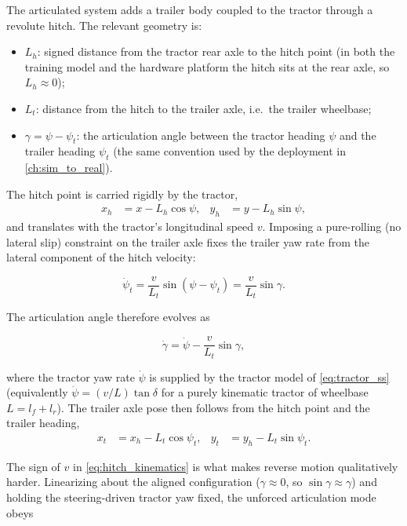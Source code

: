 The articulated system adds a trailer body coupled to the tractor through a revolute hitch.
The relevant geometry is:
\begin{itemize}
    \item $L_h$: signed distance from the tractor rear axle to the hitch point (in both the
    training model and the hardware platform the hitch sits at the rear axle, so
    $L_h \approx 0$);
    \item $L_t$: distance from the hitch to the trailer axle, i.e.\ the trailer wheelbase;
    \item $\gamma = \psi - \psi_t$: the articulation angle between the tractor heading $\psi$
    and the trailer heading $\psi_t$ (the same convention used by the deployment in
    \cref{ch:sim_to_real}).
\end{itemize}

The hitch point is carried rigidly by the tractor,
\begin{align}
    x_h &= x - L_h\cos\psi, & y_h &= y - L_h\sin\psi,
    \label{eq:hitch_point}
\end{align}
and translates with the tractor's longitudinal speed $v$. Imposing a pure-rolling (no lateral
slip) constraint on the trailer axle fixes the trailer yaw rate from the lateral component of
the hitch velocity:

\begin{equation}
    \dot{\psi}_t = \frac{v}{L_t}\sin(\psi - \psi_t) = \frac{v}{L_t}\sin\gamma .
    \label{eq:trailer_yaw}
\end{equation}

The articulation angle therefore evolves as

\begin{equation}
    \dot{\gamma} = \dot{\psi} - \frac{v}{L_t}\sin\gamma ,
    \label{eq:hitch_kinematics}
\end{equation}

where the tractor yaw rate $\dot{\psi}$ is supplied by the tractor model of
\cref{eq:tractor_ss} (equivalently $\dot{\psi} = (v/L)\tan\delta$ for a purely kinematic
tractor of wheelbase $L = l_f + l_r$). The trailer axle pose then follows from the hitch point
and the trailer heading,
\begin{align}
    x_t &= x_h - L_t\cos\psi_t, & y_t &= y_h - L_t\sin\psi_t .
    \label{eq:trailer_axle}
\end{align}

The sign of $v$ in \cref{eq:hitch_kinematics} is what makes reverse motion qualitatively
harder. Linearizing about the aligned configuration ($\gamma \approx 0$, so
$\sin\gamma \approx \gamma$) and holding the steering-driven tractor yaw fixed, the unforced
articulation mode obeys

